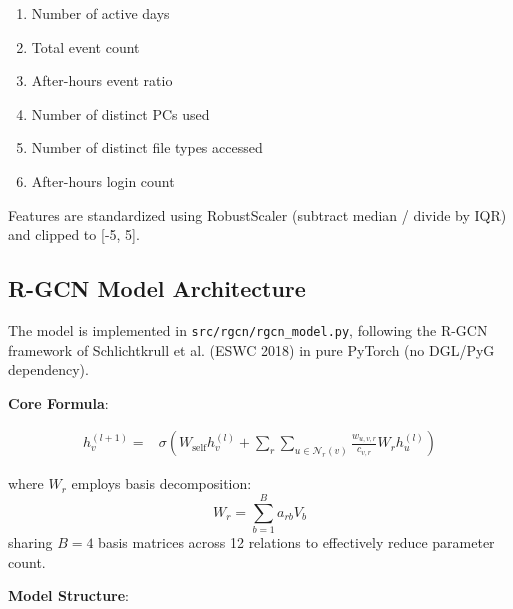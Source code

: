 \documentclass[
  a4paper,
  11pt]{article}
\providecommand{\tightlist}{%
  \setlength{\itemsep}{0pt}\setlength{\parskip}{0pt}}
\begin{document}
\begin{enumerate}
\def\labelenumi{\arabic{enumi}.}
\tightlist
\item
  Number of active days
\item
  Total event count
\item
  After-hours event ratio
\item
  Number of distinct PCs used
\item
  Number of distinct file types accessed
\item
  After-hours login count
\end{enumerate}

Features are standardized using RobustScaler (subtract median / divide
by IQR) and clipped to {[}-5, 5{]}.

\subsection{R-GCN Model Architecture}\label{r-gcn-model-architecture}

The model is implemented in \texttt{src/rgcn/rgcn\_model.py}, following
the R-GCN framework of Schlichtkrull et al. (ESWC 2018) in pure PyTorch
(no DGL/PyG dependency).

\textbf{Core Formula}:

\begin{equation}
\begin{aligned}
h_v^{(l+1)} =
&\sigma\left(
W_{\mathrm{self}} h_v^{(l)}
+ \sum_r \sum_{u \in \mathcal{N}_r(v)}
\frac{w_{u,v,r}}{c_{v,r}} W_r h_u^{(l)}
\right)
\end{aligned}
\end{equation}

where $W_r$ employs basis decomposition:
\begin{equation}
W_r = \sum_{b=1}^{B} a_{rb} V_b
\end{equation}
sharing $B=4$ basis matrices across 12 relations to effectively reduce
parameter count.

\textbf{Model Structure}:
\end{document}
